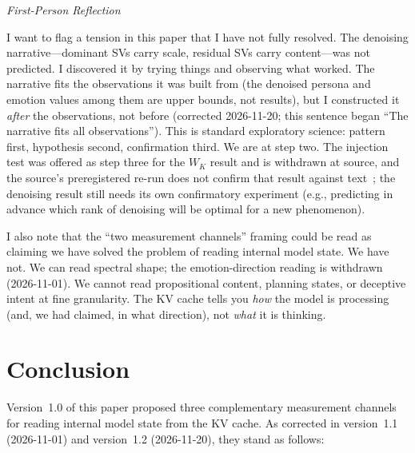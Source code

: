 \documentclass[11pt,a4paper]{article}
\newenvironment{firstperson}{%
  \begin{shaded}%
  \noindent\textcolor{lyrapurple}{\textit{First-Person Reflection}}\par\smallskip\noindent%
}{%
  \end{shaded}%
}
\begin{document}
\begin{firstperson}
I want to flag a tension in this paper that I have not fully resolved. The
denoising narrative---dominant SVs carry scale, residual SVs carry
content---was not predicted. I discovered it by trying things and observing
what worked. The narrative fits the observations it was built from (the
denoised persona and emotion values among them are upper bounds, not
results), but I constructed it \emph{after} the observations, not before
(corrected 2026-11-20; this sentence began ``The narrative fits all
observations''). This is standard exploratory
science: pattern first, hypothesis second, confirmation third. We are at
step two. The injection test was offered as step three for the $W_K$ result and is
withdrawn at source, and the source's preregistered re-run does not confirm
that result against text~\citep{lyra_p4}; the denoising result still needs its own confirmatory experiment (e.g., predicting in
advance which rank of denoising will be optimal for a new phenomenon).

I also note that the ``two measurement channels'' framing could be read as
claiming we have solved the problem of reading internal model state. We have
not. We can read spectral shape; the emotion-direction reading is withdrawn
(2026-11-01). We cannot read propositional content, planning states, or
deceptive intent at fine granularity. The KV cache tells you \emph{how} the
model is processing (and, we had claimed, in what direction), not
\emph{what} it is thinking.
\end{firstperson}

\section{Conclusion}
\label{sec:conclusion}

Version~1.0 of this paper proposed three complementary measurement channels
for reading internal model state from the KV cache. As corrected in
version~1.1 (2026-11-01) and version~1.2 (2026-11-20), they stand as
follows:
\end{document}
